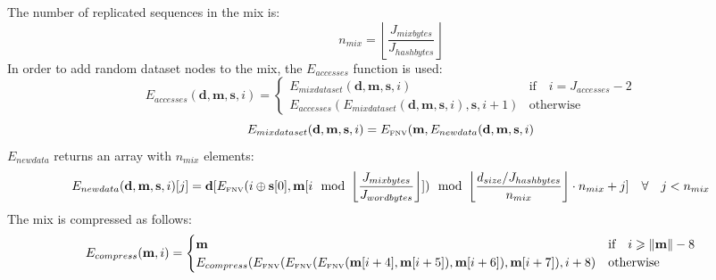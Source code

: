 \documentclass[9pt,oneside]{amsart}
\begin{document}
The number of replicated sequences in the mix is:
\begin{equation}
 n_{mix} =  \left\lfloor\frac{J_{mixbytes}}{J_{hashbytes}}\right\rfloor
\end{equation}
In order to add random dataset nodes to the mix, the $E_{accesses}$ function is used:
\begin{equation}
 E_{accesses}(\mathbf{d}, \mathbf{m}, \mathbf{s}, i) = \begin{cases}
E_{mixdataset}(\mathbf{d}, \mathbf{m},  \mathbf{s}, i) & \text{if} \quad i = J_{accesses} -2 \\
E_{accesses}(E_{mixdataset}(\mathbf{d}, \mathbf{m}, \mathbf{s}, i), \mathbf{s}, i + 1) & \text{otherwise}
\end{cases}
\end{equation}
\begin{equation}
 E_{mixdataset}(\mathbf{d}, \mathbf{m}, \mathbf{s}, i) = E_\text{\tiny FNV}(\mathbf{m}, E_{newdata}(\mathbf{d}, \mathbf{m}, \mathbf{s}, i)
\end{equation}
$E_{newdata}$ returns an array with $n_{mix}$ elements:
\begin{equation}
 E_{newdata}(\mathbf{d}, \mathbf{m}, \mathbf{s}, i)[j] = \mathbf{d}[E_\text{\tiny FNV}(i \oplus \mathbf{s}[0], \mathbf{m}[i \mod \left\lfloor\frac{J_{mixbytes}}{J_{wordbytes}}\right\rfloor]) \mod \left\lfloor\frac{d_{size} / J_{hashbytes}}{n_{mix}}\right\rfloor \cdot n_{mix} + j] \quad \forall \quad j < n_{mix}
\end{equation}
The mix is compressed as follows:
\begin{equation}
 E_{compress}(\mathbf{m}, i) = \begin{cases}
\mathbf{m} & \text{if} \quad i \geqslant \lVert \mathbf{m} \rVert - 8 \\
E_{compress}(E_\text{\tiny FNV}(E_\text{\tiny FNV}(E_\text{\tiny FNV}(\mathbf{m}[i + 4], \mathbf{m}[i + 5]), \mathbf{m}[i + 6]), \mathbf{m}[i + 7]), i + 8) & \text{otherwise}
\end{cases}
\end{equation}
\end{document}
